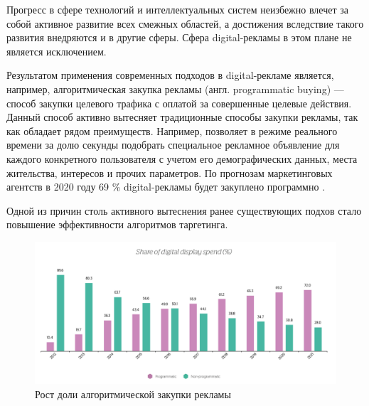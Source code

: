 \documentclass[specification,annotation,times]{itmo-student-thesis}
\begin{document}





\tableofcontents






\startprefacepage

Прогресс в сфере технологий и интеллектуальных систем неизбежно влечет за собой активное развитие всех смежных областей, а достижения вследствие такого развития внедряются и в другие сферы. Сфера digital-рекламы в этом плане не является исключением. 

Результатом применения современных подходов в digital-рекламе является, например, алгоритмическая закупка рекламы (англ. programmatic buying) \cite{programmatic-buying} — способ закупки целевого трафика с оплатой за совершенные целевые действия. Данный способ активно вытесняет традиционные способы закупки рекламы, так как обладает рядом преимуществ. Например, позволяет в режиме реального времени за долю секунды подобрать специальное рекламное объявление для каждого конкретного пользователя с учетом его демографических данных, места жительства, интересов и прочих параметров. По прогнозам маркетинговых агентств в 2020 году 69 \% digital-рекламы будет закуплено программно \cite{growth-of-programmatic}. 

Одной из причин столь активного вытеснения ранее существующих подхов стало повышение эффективности алгоритмов таргетинга. 

\begin{figure}[!h]
\caption{Рост доли алгоритмической закупки рекламы}\label{fig:share-of-programmatic}
\includegraphics[width=\textwidth]{share-of-programmatic}
\centering
\end{figure}
\end{document}
